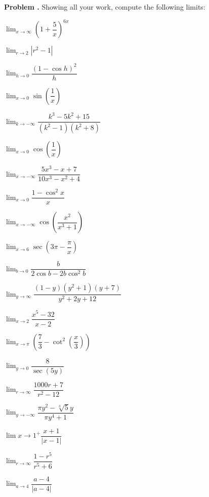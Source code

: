 \documentclass[11pt,letterpaper]{article}
\newenvironment{2enumerate}{%
	\begin{enumerate}[(a)]
	\begin{multicols}{2}
	}{%
	\end{multicols}
	\end{enumerate}
}
\newcommand{\ds}{\displaystyle}
\newcommand{\pspace}{\par\vspace{\baselineskip}}
\newcounter{problem}
\newcommand{\prob}{\stepcounter{problem}%
\noindent\textbf{Problem \theproblem. }}
\begin{document}
\newpage



\prob Showing all your work, compute the following limits:
	\begin{2enumerate}
	\item $\ds\lim_{x \to \infty} \left(1 + \dfrac{5}{x} \right)^{6x}$
	\item $\ds\lim_{r \to 2} |r^2 - 1|$
	\item $\ds\lim_{h \to 0} \dfrac{(1 - \cos h)^2}{h}$
	\item $\ds\lim_{x \to 0} \sin \left( \dfrac{1}{x} \right)$
	\item $\ds\lim_{k \to -\infty} \dfrac{k^3 - 5k^2 + 15}{(k^2 - 1)(k^2 + 8)}$
	\item $\ds\lim_{x \to 0} \cos \left( \dfrac{1}{x} \right)$
	\item $\ds\lim_{x \to -\infty} \dfrac{5x^3 - x + 7}{10x^3 - x^2 + 4}$
	\item $\ds\lim_{x \to 0} \dfrac{1 - \cos^2 x}{x}$
	\item $\ds\lim_{x \to -\infty} \cos \left( \dfrac{x^2}{x^3 + 1} \right)$
	\item $\ds\lim_{x \to 6} \sec \left( 3\pi - \dfrac{\pi}{x} \right)$
	\item $\ds\lim_{b \to 0} \dfrac{b}{2 \cos b - 2 b \cos^2 b}$
	\item $\ds\lim_{y \to \infty} \dfrac{(1 - y)(y^2 + 1)(y + 7)}{y^2 + 2y + 12}$
	\item $\ds\lim_{x \to 2} \dfrac{x^5 - 32}{x - 2}$
	\item $\ds\lim_{x \to \pi} \left( \dfrac{7}{3} - \cot^2 \left( \dfrac{x}{3} \right) \right)$
	\item $\ds\lim_{y \to 0} \dfrac{8}{\sec(5y)}$
	\item $\ds\lim_{r \to \infty} \dfrac{1000r + 7}{r^2 - 12}$
	\item $\ds\lim_{y \to -\infty} \dfrac{\pi y^2 - \sqrt[3]{5} y}{\pi y^4 + 1}$
	\item $\ds\lim{x \to 1^+} \dfrac{x + 1}{|x - 1|}$
	\item $\ds\lim_{r \to \infty} \dfrac{1 - r^5}{r^5 + 6}$
	\item $\ds\lim_{a \to 4} \dfrac{a - 4}{|a - 4|}$
	\end{2enumerate} \pspace
\end{document}
